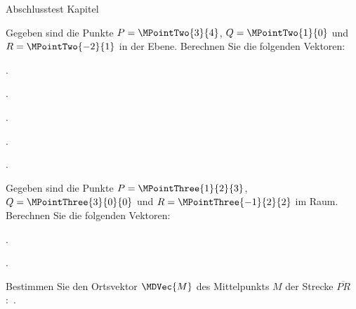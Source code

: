 \begin{MTest}{Abschlusstest Kapitel }
\begin{MExercise}
Gegeben sind die Punkte $P=\MPointTwo{3}{4}$, $Q=\MPointTwo{1}{0}$ und $R=\MPointTwo{-2}{1}$ in der Ebene. Berechnen Sie die folgenden Vektoren:
\begin{MExerciseItems}
\item{.}
\item{.}
\item{.}
\item{.}
\item{.}
\end{MExerciseItems}
\end{MExercise}


\begin{MExercise}
Gegeben sind die Punkte $P=\MPointThree{1}{2}{3}$, $Q=\MPointThree{3}{0}{0}$ und $R=\MPointThree{-1}{2}{2}$ im Raum. Berechnen Sie die folgenden Vektoren:
\begin{MExerciseItems}
\item{.}
\item{.}
\end{MExerciseItems}

Bestimmen Sie den Ortsvektor $\MDVec{M}$ des Mittelpunkts $M$ der Strecke $\overline{P R}$:\ .
\end{MExercise}


\end{MTest}
